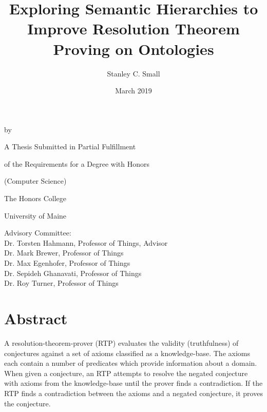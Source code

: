 \documentclass{article}
\title{Exploring Semantic Hierarchies to Improve Resolution Theorem Proving on Ontologies}
\author{Stanley C. Small}
\date{March 2019}
\begin{document}
	\begin{titlepage}
		\makeatletter
			\begin{center}
       				\MakeUppercase{\@title} \par
      				\smallskip 
     				\vspace{.15in} by \par
     				\smallskip
      				\vspace{.15in} \@author \par
      				\vspace{1in}
     				A Thesis Submitted in Partial Fulfillment  \par
      				of the Requirements for a Degree with Honors \par
      				(Computer Science) \par
      				\vspace{.75in}
      				The Honors College \par
      				University of Maine \par
      				\@date \par
     				\vfill
   			\end{center}
		\makeatother
		\begin{flushleft}
			Advisory Committee: \\
			\hspace{.3in} Dr. Torsten Hahmann, Professor of Things, Advisor \\
			\hspace{.3in} Dr. Mark Brewer, Professor of Things \\
			\hspace{.3in} Dr. Max Egenhofer, Professor of Things \\
			\hspace{.3in} Dr. Sepideh Ghanavati, Professor of Things \\
			\hspace{.3in} Dr. Roy Turner, Professor of Things
		\end{flushleft}
	\end{titlepage}
	
	\newpage
	\section*{Abstract}
A resolution-theorem-prover (RTP) evaluates the validity (truthfulness) of conjectures against a set of axioms classified as a knowledge-base. The axioms each contain a number of predicates which provide information about a domain. When given a conjecture, an RTP attempts to resolve the negated conjecture with axioms from the knowledge-base until the prover finds a contradiction. If the RTP finds a contradiction between the axioms and a negated conjecture, it proves the conjecture. 
\end{document}
